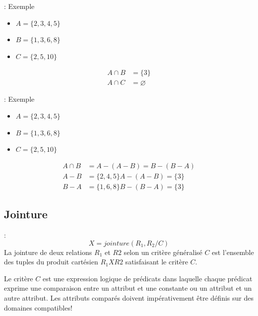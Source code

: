 \documentclass[10pt]{beamer}
\begin{document}
\begin{frame}{\secname : \subsecname}
    Exemple
    \begin{itemize}
        \item $A = \{2,3,4,5 \}$
        \item $B = \{1,3,6,8 \}$
        \item $C = \{2,5,10 \}$
    \end{itemize}
    \begin{equation}
        \begin{split}
            A \cap B & = \{3 \} \\
            A \cap C & =  \varnothing
        \end{split}
    \end{equation}
\end{frame}

\begin{frame}{\secname : \subsecname}
    Exemple
    \begin{itemize}
        \item $A = \{2,3,4,5 \}$
        \item $B = \{1,3,6,8 \}$
        \item $C = \{2,5,10 \}$
    \end{itemize}
    \begin{equation}
        \begin{split}
            A \cap B & = A - (A-B) = B- (B-A) \\
            A - B & = \{2, 4, 5\}      A - (A - B) = \{3\} \\
            B - A & = \{1, 6, 8\}      B - (B - A) = \{3\}
        \end{split}
    \end{equation}
\end{frame}


\subsection{Jointure}
\begin{frame}{\secname : \subsecname}
    $$
        X = jointure(R_1,R_2 / C)
    $$
    La jointure de deux relations $R_1$ et $R2$ selon un critère généralisé $C$ est l’ensemble des tuples du produit cartésien $R_1 X R2$ satisfaisant le critère $C$.

    Le critère $C$ est une expression logique de prédicats dans laquelle chaque prédicat exprime une comparaison entre un attribut et une constante ou un attribut et un autre attribut.
    Les attributs comparés doivent impérativement être définis sur des domaines compatibles!
\end{frame}
\end{document}
